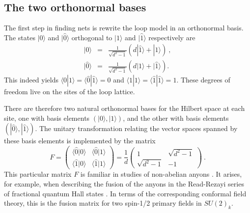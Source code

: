 \documentclass[11pt]{article}
\newcommand{\wwr}{|\widehat{0}\rangle}
\newcommand{\xxr}{|\widehat{1}\rangle}
\newcommand{\wwl}{\langle\widehat{0}}
\newcommand{\xxl}{\langle\widehat{1}}
\begin{document}
\subsection{The two orthonormal bases}
\label{subsec:bases}

The first step in finding nets
is rewrite the loop model in an orthonormal basis. 
The states $|0\rangle$ and $\wwr$ orthogonal to $|1\rangle$
and $\xxr$ respectively are
\begin{eqnarray}
\label{def1}
|0\rangle &=& \frac{1}{\sqrt{d^2-1}}\left(d\xxr+|1\rangle\right)\ ,\\
\wwr &=& 
\frac{1}{\sqrt{d^2-1}}\left(d|1\rangle+\xxr\right).
\label{def1tilde}
\end{eqnarray}
This indeed yields
$\langle 0|1\rangle =\wwl\xxr=0$ and $\langle 1|1\rangle
=\xxl\xxr=1.$ 
These degrees of freedom live on the sites of the loop lattice.


There are therefore two natural orthonormal bases for the Hilbert space
at each site, one with basis elements $(|0\rangle,|1\rangle)$, 
and the other with basis elements $(\wwr,\xxr)$. 
The unitary
transformation relating the vector spaces spanned by these basis
elements is implemented by the matrix
\begin{equation}
 F=
\begin{pmatrix}
\wwl|0\rangle & \wwl|1\rangle \\
\xxl|0\rangle & \xxl|1\rangle
\end{pmatrix}
=\frac{1}{d}
\begin{pmatrix}
1 & \sqrt{d^2-1}\\
\sqrt{d^2-1} & -1
\end{pmatrix}\ .
\label{Fmat}
\end{equation}
This particular matrix $F$ 
is familiar in studies of
non-abelian anyons \cite{DFNSS,Preskill}. It arises, for example, when describing the fusion of the
anyons in the Read-Rezayi series of fractional quantum Hall states
\cite{RR}. In terms of the corresponding conformal field
theory, this is the fusion matrix for two spin-1/2 primary fields in
$SU(2)_k$. 
\end{document}
